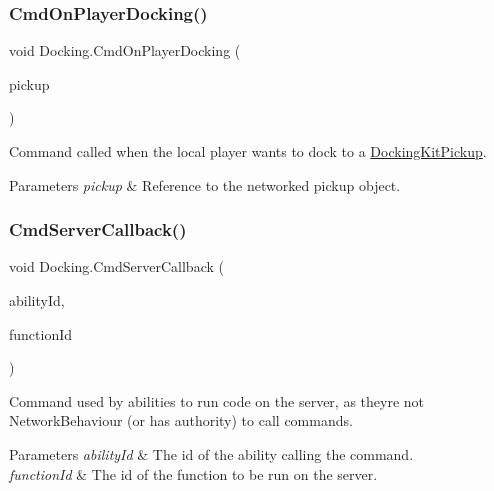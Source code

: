 \subsubsection{\texorpdfstring{Cmd\+On\+Player\+Docking()}{CmdOnPlayerDocking()}}
{\footnotesize\ttfamily void Docking.\+Cmd\+On\+Player\+Docking (\begin{DoxyParamCaption}\item[{Game\+Object}]{pickup }\end{DoxyParamCaption})}



Command called when the local player wants to dock to a \hyperlink{class_docking_kit_pickup}{Docking\+Kit\+Pickup}. 


\begin{DoxyParams}{Parameters}
{\em pickup} & Reference to the networked pickup object.\\
\hline
\end{DoxyParams}
\hypertarget{class_docking_a3c06359cbaa3683d3934674641328776}{}\label{class_docking_a3c06359cbaa3683d3934674641328776} 
\subsubsection{\texorpdfstring{Cmd\+Server\+Callback()}{CmdServerCallback()}}
{\footnotesize\ttfamily void Docking.\+Cmd\+Server\+Callback (\begin{DoxyParamCaption}\item[{int}]{ability\+Id,  }\item[{int}]{function\+Id }\end{DoxyParamCaption})}



Command used by abilities to run code on the server, as they\textquotesingle{}re not Network\+Behaviour (or has authority) to call commands. 


\begin{DoxyParams}{Parameters}
{\em ability\+Id} & The id of the ability calling the command.\\
\hline
{\em function\+Id} & The id of the function to be run on the server.\\
\hline
\end{DoxyParams}
\hypertarget{class_docking_af1a41524e65fb8d56334e76090d3a23e}{}\label{class_docking_af1a41524e65fb8d56334e76090d3a23e} 
